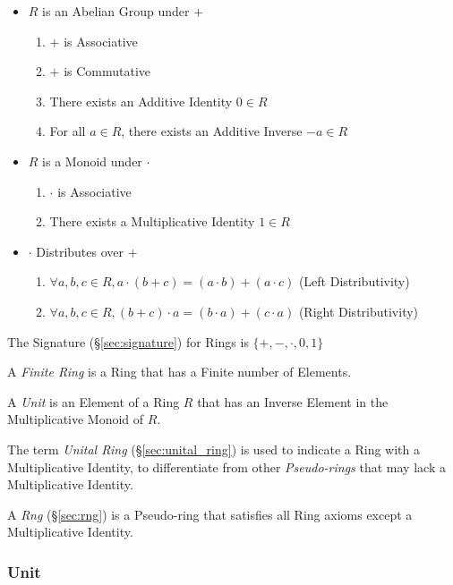 \begin{itemize}
\item $R$ is an Abelian Group under $+$
    \begin{enumerate}
        \item $+$ is Associative
        \item $+$ is Commutative
        \item There exists an Additive Identity $0 \in R$
        \item For all $a \in R$, there exists an Additive Inverse $-a
          \in R$
    \end{enumerate}
\item $R$ is a Monoid under $\cdot$
    \begin{enumerate}
        \item $\cdot$ is Associative
        \item There exists a Multiplicative Identity $1 \in R$
    \end{enumerate}
\item $\cdot$ Distributes over $+$
    \begin{enumerate}
        \item $\forall a,b,c \in R,
            a \cdot (b + c) = (a \cdot b) + (a \cdot c)$
            (Left Distributivity)
        \item $\forall a,b,c \in R,
            (b + c) \cdot a = (b \cdot a) + (c \cdot a)$
            (Right Distributivity)
    \end{enumerate}
\end{itemize}
The Signature (\S\ref{sec:signature}) for Rings is $\{+, -, \cdot, 0,
1\}$

A \emph{Finite Ring} is a Ring that has a Finite number of Elements.

A \emph{Unit} is an Element of a Ring $R$ that has an Inverse
Element in the Multiplicative Monoid of $R$.

The term \emph{Unital Ring} (\S\ref{sec:unital_ring}) is used to
indicate a Ring with a Multiplicative Identity, to differentiate from
other \emph{Pseudo-rings} that may lack a Multiplicative Identity.

A \emph{Rng} (\S\ref{sec:rng}) is a Pseudo-ring that satisfies all
Ring axioms except a Multiplicative Identity.



\subsubsection{Unit}\label{sec:ring_unit}

